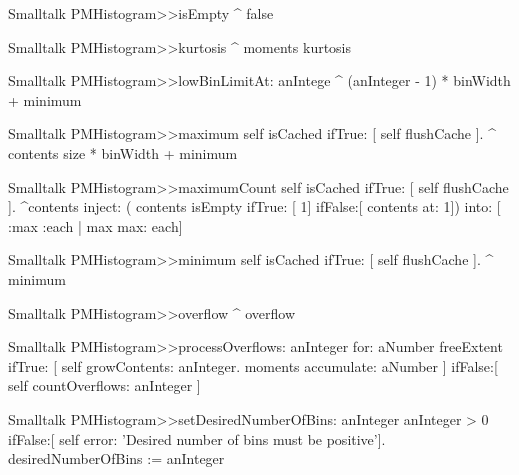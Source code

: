 \begin{displaycode}{Smalltalk}
PMHistogram>>isEmpty
    ^ false
\end{displaycode}

\begin{displaycode}{Smalltalk}
PMHistogram>>kurtosis
    ^ moments kurtosis
\end{displaycode}
  
\begin{displaycode}{Smalltalk}
PMHistogram>>lowBinLimitAt: anIntege
    ^ (anInteger - 1) * binWidth + minimum
\end{displaycode}
  
\begin{displaycode}{Smalltalk}
PMHistogram>>maximum
    self isCached
        ifTrue: [ self flushCache ].
    ^ contents size * binWidth + minimum
\end{displaycode}
  
\begin{displaycode}{Smalltalk}
PMHistogram>>maximumCount
    self isCached
        ifTrue: [ self flushCache ].
    ^contents inject: ( contents isEmpty ifTrue: [ 1] ifFalse:[ 
                                                      contents at: 1])
                    into: [ :max :each | max max: each]
\end{displaycode}
                  
\begin{displaycode}{Smalltalk}
PMHistogram>>minimum
    self isCached
        ifTrue: [ self flushCache ].
    ^ minimum
\end{displaycode}
  
\begin{displaycode}{Smalltalk}
PMHistogram>>overflow
    ^ overflow
\end{displaycode}
  
\begin{displaycode}{Smalltalk}
PMHistogram>>processOverflows: anInteger for: aNumber
    freeExtent
        ifTrue: [ self growContents: anInteger.
                     moments accumulate: aNumber
                   ]
        ifFalse:[ self countOverflows: anInteger ]
\end{displaycode}

\begin{displaycode}{Smalltalk}
PMHistogram>>setDesiredNumberOfBins: anInteger
    anInteger > 0
        ifFalse:[ self error: 'Desired number of bins must be 
                                                           positive'].
    desiredNumberOfBins := anInteger
\end{displaycode}
  
